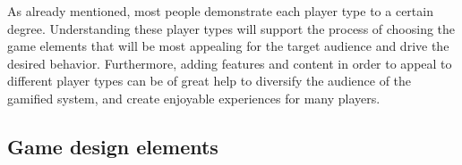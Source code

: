 As already mentioned, most people demonstrate each player type to a certain degree. Understanding these player types will support 
the process of choosing the game elements that will be most appealing for the target audience and drive the 
desired behavior. Furthermore, adding features and content in order to appeal to different player types can be of great help to diversify the audience of the gamified system, and create enjoyable experiences for many players.

\subsection{Game design elements}
